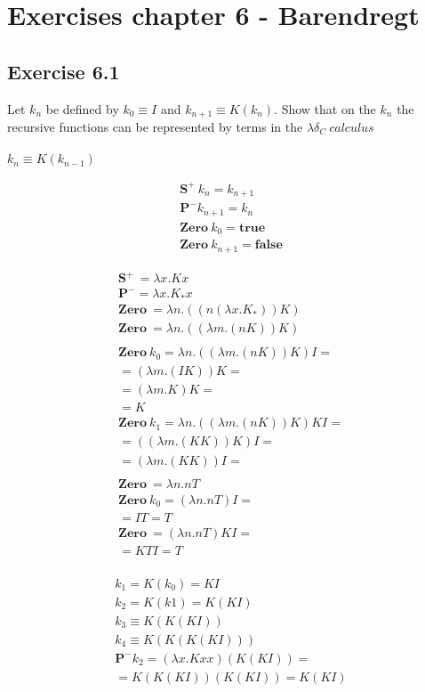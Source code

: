 \documentclass[11pt]{article}
\begin{document}
\section{Exercises chapter 6 - Barendregt}
\subsection*{Exercise 6.1}
Let $k_n$ be defined by $k_0 \equiv I$ and $k_{n+1} \equiv K(k_n)$. Show that on the $k_n$ the recursive functions can be represented by terms in the $\lambda \delta_C\ calculus$\\
\\
$k_n \equiv K(k_{n-1})$

\begin{gather*}
\mathbf{S^+}\ k_n = k_{n + 1} \\
\mathbf{P^-} k_{n + 1} = k_n \\
\mathbf{Zero}\ k_0 = \mathbf{true} \\
\mathbf{Zero}\ k_{n + 1} = \mathbf{false}
\end{gather*}

\begin{gather*}
\mathbf{S^+}\ = \lambda x. Kx \\
\mathbf{P^-} = \lambda x. K_*x \\
\mathbf{Zero}\ = \lambda n. ((n (\lambda x.K_*)) K) \\
\mathbf{Zero}\ = \lambda n.((\lambda m. (n K)) K) \\
\\
\mathbf{Zero}\ k_0 = \lambda n.((\lambda m. (n K)) K) I = \\
= (\lambda m. (I K)) K = \\
= (\lambda m. K) K = \\
= K \\
\mathbf{Zero}\ k_1 = \lambda n.((\lambda m. (n K)) K) KI = \\
= ((\lambda m. (K K)) K)I = \\
= (\lambda m. (K K)) I = \\
\\
\mathbf{Zero}\ = \lambda n.n T \\
\mathbf{Zero}\ k_0 = (\lambda n.n T) I = \\
= I T = T \\
\mathbf{Zero}\ = (\lambda n.n T)KI = \\
= K T I = T \\
\end{gather*}

\begin{gather*}
k_1 = K(k_0) = KI \\
k_2 = K(k1) = K(KI) \\
k_3 \equiv K(K(KI)) \\
k_4 \equiv K(K(K(KI))) \\
\mathbf{P^-} k_2 = (\lambda x. Kxx) (K(KI)) = \\
= K(K(KI))(K(KI)) = K(KI)
\end{gather*}
\end{document}
